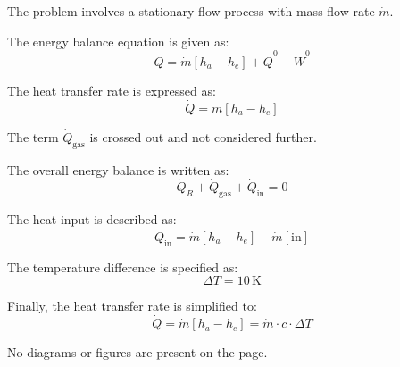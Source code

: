 The problem involves a stationary flow process with mass flow rate \( \dot{m} \).  

The energy balance equation is given as:  
\[
\dot{Q} = \dot{m} \left[ h_a - h_e \right] + \dot{Q}^0 - \dot{W}^0
\]  

The heat transfer rate is expressed as:  
\[
\dot{Q} = \dot{m} \left[ h_a - h_e \right]
\]  

The term \( \dot{Q}_{\text{gas}} \) is crossed out and not considered further.  

The overall energy balance is written as:  
\[
\dot{Q}_R + \dot{Q}_{\text{gas}} + \dot{Q}_{\text{in}} = 0
\]  

The heat input is described as:  
\[
\dot{Q}_{\text{in}} = \dot{m} \left[ h_a - h_e \right] - \dot{m} \left[ \text{in} \right]
\]  

The temperature difference is specified as:  
\[
\Delta T = 10 \, \text{K}
\]  

Finally, the heat transfer rate is simplified to:  
\[
\dot{Q} = \dot{m} \left[ h_a - h_e \right] = \dot{m} \cdot c \cdot \Delta T
\]  

No diagrams or figures are present on the page.